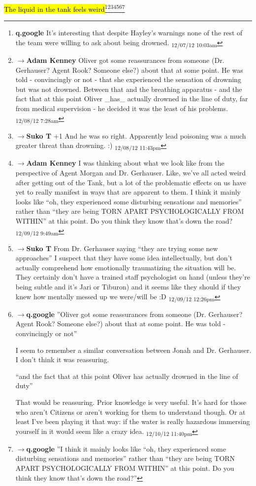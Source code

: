 \hl{The liquid in the tank feels weird}\footnote{\textbf{q.google }It's interesting that despite Hayley's warnings none of the rest of the team were willing to ask about being drowned. \textsubscript{12/07/12 10:03am}}\footnote{$\rightarrow$\textbf{Adam Kenney }Oliver got some reassurances from someone (Dr. Gerhauser? Agent Rook? Someone else?) about that at some point.  He was told - convincingly or not - that she experienced the sensation of drowning but was not drowned.  Between that and the breathing apparatus - and the fact that at this point Oliver \_has\_ actually drowned in the line of duty, far from medical supervision - he decided it was the least of his problems. \textsubscript{12/08/12 7:28am}}\footnote{$\rightarrow$\textbf{Suko T }+1 
And he was so right.  Apparently lead poisoning was a much greater threat than drowning. :) \textsubscript{12/08/12 11:43pm}}\footnote{$\rightarrow$\textbf{Adam Kenney }I was thinking about what we look like from the perspective of Agent Morgan and Dr. Gerhauser.  Like, we've all acted weird after getting out of the Tank, but a lot of the problematic effects on us have yet to really manifest in ways that are apparent to them.  I think it mainly looks like ``oh, they experienced some disturbing sensations and memories'' rather than ``they are being TORN APART PSYCHOLOGICALLY FROM WITHIN'' at this point.  Do you think they know that's down the road? \textsubscript{12/09/12 9:49am}}\footnote{$\rightarrow$\textbf{Suko T }From Dr. Gerhauser saying ``they are trying some new approaches'' I suspect that they have some idea intellectually, but don't actually comprehend how emotionally traumatizing the situation will be.  They certainly don't have a trained staff psychologist on hand (unless they're being subtle and it's Jari or Tiburon) and it seems like they should if they knew how mentally messed up we were/will be :D \textsubscript{12/09/12 12:26pm}}\footnote{$\rightarrow$\textbf{q.google }''Oliver got some reassurances from someone (Dr. Gerhauser? Agent Rook? Someone else?) about that at some point. He was told - convincingly or not''

I seem to remember a similar conversation between Jonah and Dr. Gerhauser.  I don't think it was reassuring.

``and the fact that at this point Oliver has actually drowned in the line of duty''

That would be reassuring.  Prior knowledge is very useful.  It's hard for those who aren't Citizens or aren't working for them to understand though.  Or at least I've been playing it that way: if the water is really hazardous immersing yourself in it would seem like a crazy idea. \textsubscript{12/10/12 11:40pm}}\footnote{$\rightarrow$\textbf{q.google }''I think it mainly looks like ``oh, they experienced some disturbing sensations and memories'' rather than ``they are being TORN APART PSYCHOLOGICALLY FROM WITHIN'' at this point.
Do you think they know that's down the road?''

}
